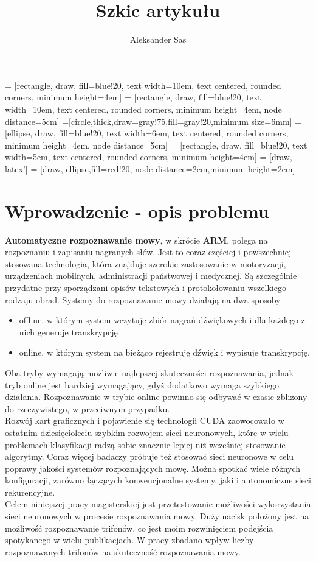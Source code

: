 \documentclass[11pt]{article}
\author{Aleksander Sas}
\title{Szkic artykułu}
\begin{document}
 = [rectangle, draw, fill=blue!20, text width=10em, text centered, rounded corners, minimum height=4em]
 = [rectangle, draw, fill=blue!20, text width=10em, text centered, rounded corners, minimum height=4em, node distance=5cm]
=[circle,thick,draw=gray!75,fill=gray!20,minimum size=6mm]
 = [ellipse, draw, fill=blue!20, text width=6em, text centered, rounded corners, minimum height=4em, node distance=5cm]
 = [rectangle, draw, fill=blue!20, text width=5em, text centered, rounded corners, minimum height=4em]
 = [draw, -latex']
 = [draw, ellipse,fill=red!20, node distance=2cm,minimum height=2em]

\maketitle
\tableofcontents

\section{Wprowadzenie - opis problemu}
	\textbf{Automatyczne rozpoznawanie mowy}, w skrócie \textbf{ARM}, polega na rozpoznaniu i zapisaniu nagranych słów. Jest to coraz częściej i powszechniej stosowana technologia, która znajduje szerokie zastosowanie w motoryzacji, urządzeniach mobilnych, administracji państwowej i medycznej. Są szczególnie przydatne przy sporządzani opisów tekstowych i protokołowaniu wszelkiego rodzaju obrad. Systemy do rozpoznawanie mowy działają na dwa sposoby
	\begin{itemize}
		\item offline, w którym system wczytuje zbiór nagrań dźwiękowych i dla każdego z nich generuje transkrypcję
		\item online, w którym system na bieżąco rejestruję dźwięk i wypisuje transkrypcję.
	\end{itemize}
	Oba tryby wymagają możliwie najlepszej skuteczności rozpoznawania, jednak tryb online jest bardziej wymagający, gdyż dodatkowo wymaga szybkiego działania. Rozpoznawanie w trybie online powinno się odbywać w czasie zbliżony do rzeczywistego, w przeciwnym przypadku. 
	\\
	Rozwój kart graficznych i pojawienie się technologii CUDA zaowocowało w ostatnim dziesięcioleciu szybkim rozwojem sieci neuronowych, które w wielu problemach klasyfikacji radzą sobie znacznie lepiej niż wcześniej stosowanie algorytmy. Coraz więcej badaczy próbuje też stosować sieci neuronowe w celu poprawy jakości systemów rozpoznających mowę. Można spotkać wiele różnych konfiguracji, zarówno łączących konwencjonalne systemy, jaki i autonomiczne sieci rekurencyjne.
	\\
	Celem niniejszej pracy magisterskiej jest przetestowanie możliwości wykorzystania sieci neuronowych w procesie rozpoznawania mowy. Duży nacisk położony jest na możliwość rozpoznawanie trifonów, co jest moim rozwinięciem podejścia spotykanego w wielu publikacjach. W pracy zbadano wpływ liczby rozpoznawanych trifonów na skuteczność rozpoznawania mowy.
	
\end{document}
